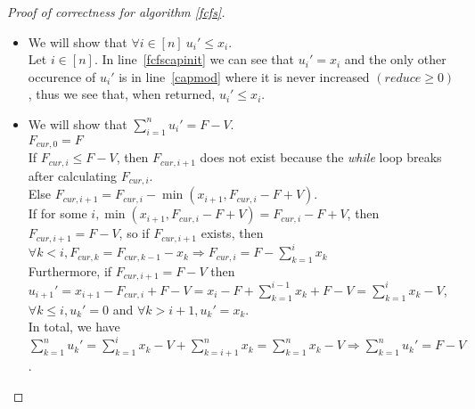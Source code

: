 \begin{proof}[Proof of correctness for algorithm \ref{fcfs}]
   \begin{itemize}
      \item We will show that $\forall i \in [n] \: u_i' \leq x_i$. \\
      Let $i \in [n]$. In line~\ref{fcfscapinit} we can see that $u_i' = x_i$ and the only other occurence of $u_i'$
      is in line~\ref{capmod} where it is never increased $(reduce \geq 0)$, thus we see that, when returned,
      $u_i' \leq x_i$.
      \item We will show that $\sum\limits_{i=1}^{n}u_i' = F - V$. \\
      $F_{cur,0} = F$ \\
      If $F_{cur,i} \leq F - V$, then $F_{cur,i+1}$ does not exist because the \emph{while} loop breaks after calculating
      $F_{cur,i}$. \\
      Else $F_{cur,i+1} = F_{cur,i} - \min{(x_{i+1}, F_{cur,i} - F + V)}$. \\
      If for some $i, \min{(x_{i+1}, F_{cur,i} - F + V)} = F_{cur,i} - F + V$, then $F_{cur,i+1} = F - V$, so if
      $F_{cur,i+1}$ exists, then $\forall k < i, F_{cur,k} = F_{cur,k-1} - x_k \Rightarrow F_{cur,i} =
      F - \sum\limits_{k=1}^{i}x_k$ \\
      Furthermore, if $F_{cur,i+1} = F - V$ then $u_{i+1}' = x_{i+1} - F_{cur,i} + F - V =
      x_i - F + \sum\limits_{k=1}^{i-1}x_k + F - V = \sum\limits_{k=1}^{i}x_k - V$, $\forall k \leq i, u_k' = 0$
      and $\forall k > i+1, u_k' = x_k$. \\
      In total, we have $\sum\limits_{k=1}^{n}u_k' = \sum\limits_{k=1}^{i}x_k - V + \sum\limits_{k=i+1}^{n}x_k =
      \sum\limits_{k=1}^{n}x_k - V \Rightarrow \sum\limits_{k=1}^{n}u_k' = F - V$.
   \end{itemize}
\end{proof}
